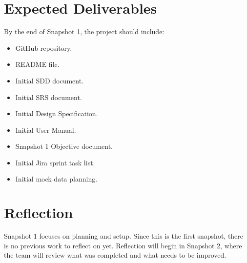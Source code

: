 \documentclass[12pt]{article}
\begin{document}
\section{Expected Deliverables}

By the end of Snapshot 1, the project should include:

\begin{itemize}
    \item GitHub repository.
    \item README file.
    \item Initial SDD document.
    \item Initial SRS document.
    \item Initial Design Specification.
    \item Initial User Manual.
    \item Snapshot 1 Objective document.
    \item Initial Jira sprint task list.
    \item Initial mock data planning.
\end{itemize}

\section{Reflection}

Snapshot 1 focuses on planning and setup. Since this is the first snapshot, there is no previous work to reflect on yet. Reflection will begin in Snapshot 2, where the team will review what was completed and what needs to be improved.
\end{document}
